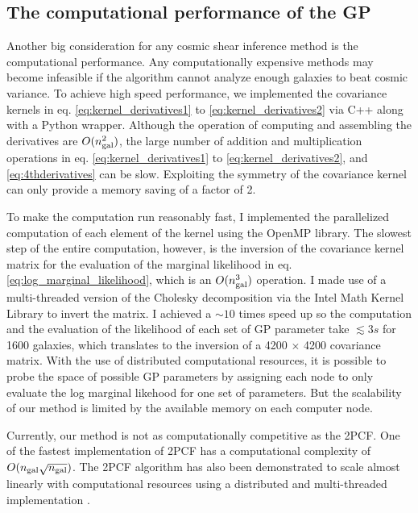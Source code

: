 \subsection{The computational performance of the GP}
\label{subsec:computational_performance}
Another big consideration for any cosmic shear inference method is the computational performance.
Any
computationally expensive methods may become infeasible if the algorithm cannot 
analyze enough galaxies to beat cosmic variance. 
To achieve high speed performance, we  
implemented the covariance kernels in eq. \ref{eq:kernel_derivatives1} to
\ref{eq:kernel_derivatives2}
via {\sc C++} along with a {\sc Python} wrapper. 
Although the operation of computing and assembling the
derivatives are $O(n_{\rm gal}^2)$, the large number of addition and 
multiplication operations in eq. \ref{eq:kernel_derivatives1} to
\ref{eq:kernel_derivatives2}, and \ref{eq:4thderivatives} can be slow.
Exploiting the symmetry of the covariance kernel can only provide 
a memory saving of a factor of 2.

To make the computation run reasonably fast, 
I implemented the parallelized computation of each element of the kernel using 
the {\sc OpenMP} library. The slowest step of the entire computation, however, 
is the inversion of the
covariance kernel matrix for the evaluation of the marginal likelihood in eq.
\ref{eq:log_marginal_likelihood}, 
which is an $O(n_{\rm gal}^3)$ operation. 
I made use of a multi-threaded version of the Cholesky decomposition via the {\sc Intel Math
Kernel Library} to invert the matrix. I achieved a $\sim10$ 
times speed up so the computation and the evaluation of the likelihood of each set of GP parameter
take $\lesssim 3s$ for 1600 galaxies, which translates to 
the inversion of a 4200 $\times$ 4200 covariance matrix.
With the use of distributed computational resources, it is possible 
to probe the space of possible GP parameters by assigning each node to only
evaluate the log marginal likehood for one set of parameters. 
But the scalability of our method is limited by the available memory on each
computer node.

Currently, our method is not as computationally competitive as the 2PCF. One of
the fastest implementation of 2PCF has a computational complexity of
$O(n_{\rm gal}\sqrt{n_{\rm gal}})$.
The 2PCF algorithm has also been demonstrated to scale almost linearly with
computational resources 
using a distributed and multi-threaded implementation \citep{Chhugani2012}. 

